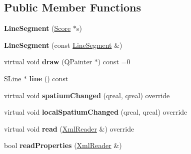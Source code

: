 \subsection*{Public Member Functions}
\begin{DoxyCompactItemize}
\item 
\mbox{\label{class_ms_1_1_line_segment_a6b1c6707420c898dd3afc671ddc399a2}} 
{\bfseries Line\+Segment} (\hyperlink{class_ms_1_1_score}{Score} $\ast$s)
\item 
\mbox{\label{class_ms_1_1_line_segment_ac03ca3efdb93b6add09d10ca8d51009e}} 
{\bfseries Line\+Segment} (const \hyperlink{class_ms_1_1_line_segment}{Line\+Segment} \&)
\item 
\mbox{\label{class_ms_1_1_line_segment_af60bd3bae43bd6c8808b00f0f82e2285}} 
virtual void {\bfseries draw} (Q\+Painter $\ast$) const =0
\item 
\mbox{\label{class_ms_1_1_line_segment_a24ae148f9c72c5277e70d85433463d1c}} 
\hyperlink{class_ms_1_1_s_line}{S\+Line} $\ast$ {\bfseries line} () const
\item 
\mbox{\label{class_ms_1_1_line_segment_aecd81b70f7c7de13b9d925613ffaae7f}} 
virtual void {\bfseries spatium\+Changed} (qreal, qreal) override
\item 
\mbox{\label{class_ms_1_1_line_segment_a43cc734ab61a1b6f22366dd7a5ae9975}} 
virtual void {\bfseries local\+Spatium\+Changed} (qreal, qreal) override
\item 
\mbox{\label{class_ms_1_1_line_segment_afcab66c255989e2dcfc80f7bc36103ef}} 
virtual void {\bfseries read} (\hyperlink{class_ms_1_1_xml_reader}{Xml\+Reader} \&) override
\item 
\mbox{\label{class_ms_1_1_line_segment_a109aa7094c1de7200c77422174a2dd25}} 
bool {\bfseries read\+Properties} (\hyperlink{class_ms_1_1_xml_reader}{Xml\+Reader} \&)
\item 
\mbox{\label{class_ms_1_1_line_segment_a0dd1e21af498b4eea6969e9b2ea67111}} 

\end{DoxyCompactItemize}
